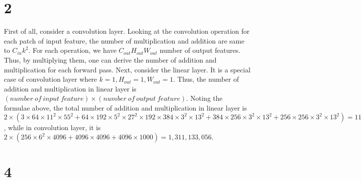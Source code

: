 \documentclass[10pt]{article}
\begin{document}
\section*{2}
First of all, consider a convolution layer. 
Looking at the convolution operation for each patch of input feature, the number of multiplication and 
addition are same to $C_{in}k^2$. For each operation, we have $C_{out}H_{out}W_{out}$ number of output features.
Thus, by multiplying them, one can derive the number of addition and multiplication for each forward pass. 
Next, consider the linear layer. It is a special case of convolution layer where $k = 1, H_{out} = 1, W_{out} = 1$. Thus, 
the number of addition and multiplication in linear layer is $(number\ of\ input\ feature)\times(number\ of\ output\ feature)$.
Noting the formulae above, the total number of addition and multiplication in linear layer is 
$2\times(3\times 64\times 11^2 \times 55^2 + 64\times 192 \times 5^2 \times 27^2 \times 192 \times 384 \times 3^2 \times 13^2  + 384 \times 256 \times 3^2 \times 13^2 + 256 \times 256 \times 3^2 \times 13^2) = 117,243,904$
, while in convolution layer, it is $2\times\left(256 \times 6^2 \times 4096 + 4096 \times 4096 + 4096 \times 1000\right) = 1,311,133,056.$

\section*{4}
\end{document}
